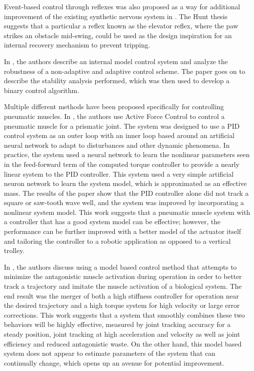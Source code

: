 Event-based control through reflexes was also proposed as a way for additional
improvement of the existing synthetic nervous system in \cite{HuntPhDThesis}.
The Hunt thesis \cite{HuntPhDThesis} suggests that a particular a reflex known as the elevator reflex,
where the paw strikes an
obstacle mid-swing, could be used as the design inspiration for an internal recovery
mechanism to prevent tripping.


In \cite{InternalModel}, the authors describe an internal model control system and analyze the robustness of a non-adaptive and adaptive control scheme. The paper goes on to describe the stability analysis performed, which was then used to develop a binary control algorithm.



Multiple different methods have been proposed specifically for controlling pneumatic muscles. In \cite{Jahanabadi2009}, the authors use Active Force Control
to control a pneumatic muscle for a prismatic joint. The system was designed to
use a PID control system as an outer loop with an inner loop based around an
artificial neural network to adapt to disturbances and other dynamic phenomena.
In practice, the system used a neural network to learn the nonlinear parameters
seen in the feed-forward term of the computed torque controller to provide a
nearly linear system to the PID controller. This system used a very simple
artificial neuron network to learn the system model, which is approximated as an
effective mass. The results of the paper show that the PID controller alone did
not track a square or saw-tooth wave well, and the system was improved by
incorporating a nonlinear system model. This work suggests that a pneumatic 
muscle system with a controller that has a good system model can be effective; however, the performance can be further improved with a better model of the
actuator itself and tailoring the controller to a robotic application as opposed
to a vertical trolley.

In \cite{Wang2013}, the authors discuss using a model based control method that
attempts to minimize the antagonistic muscle activation during operation in
order to better track a trajectory and imitate the muscle activation of a
biological system. The end result was the merger of both a high stiffness 
controller for operation near the desired trajectory and a high torque system
for high velocity or large error corrections. This work suggests that a system 
that smoothly combines these two behaviors will be highly effective, measured by
joint tracking accuracy for a steady position, joint tracking at high 
acceleration and velocity as well as joint efficiency and reduced antagonistic
waste. On the other hand, this model based system does not appear to estimate
parameters of the system that can continually change, which opens up an avenue
for potential improvement.

